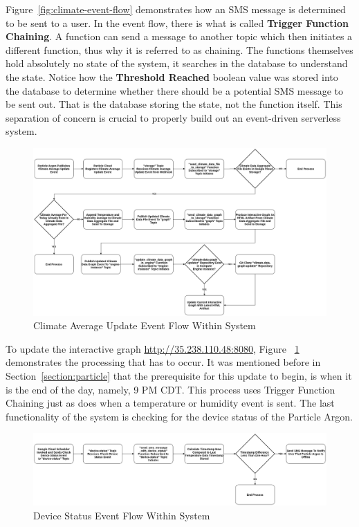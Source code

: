 \documentclass{article}
\begin{document}
Figure~\ref{fig:climate-event-flow} demonstrates how an SMS message is determined to be sent to a user. In the event flow, there is what is called \textbf{Trigger Function Chaining}. A function can send a message to another topic which then initiates a different function, thus why it is referred to as chaining. The functions themselves hold absolutely no state of the system, it searches in the database to understand the state. Notice how the \textbf{Threshold Reached} boolean value was stored into the database to determine whether there should be a potential SMS message to be sent out. That is the database storing the state, not the function itself. This separation of concern is crucial to properly build out an event-driven serverless system.

\begin{figure}[H]
    \center
    \includegraphics[width=\textwidth]{images/graph-event-flow.png}
    \caption{Climate Average Update Event Flow Within System}
    \label{fig:graph-event-flow}
\end{figure}

To update the interactive graph \url{http://35.238.110.48:8080}, Figure ~\ref{fig:graph-event-flow} demonstrates the processing that has to occur. It was mentioned before in Section~\ref{section:particle} that the prerequisite for this update to begin, is when it is the end of the day, namely, 9 PM CDT. This process uses Trigger Function Chaining just as does when a temperature or humidity event is sent. The last functionality of the system is checking for the device status of the Particle Argon.

\begin{figure}[H]
    \center
    \includegraphics[width=\textwidth]{images/device-status-event-flow.png}
    \caption{Device Status Event Flow Within System}
    \label{fig:device-status-event-flow}
\end{figure}
\end{document}
